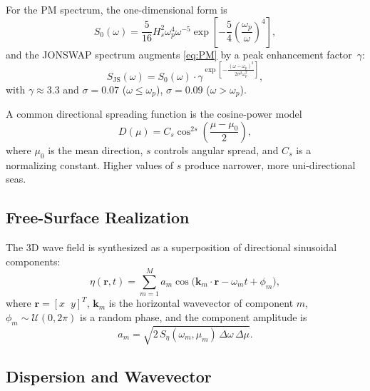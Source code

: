 \documentclass[journal,10pt,twocolumn]{IEEEtran}
\newcommand{\vect}[1]{\bm{#1}}
\begin{document}
    For the PM spectrum, the one-dimensional form is
    \begin{equation}
        S_0(\omega) = \frac{5}{16}H_s^2\omega_p^4\omega^{-5}
        \exp\!\left[-\frac{5}{4}\!\left(\frac{\omega_p}{\omega}\right)^{\!4}\right],
        \label{eq:PM}
    \end{equation}
    and the JONSWAP spectrum augments \eqref{eq:PM} by a peak enhancement factor~$\gamma$:
    \begin{equation}
        S_{\mathrm{JS}}(\omega) = S_0(\omega)\cdot
        \gamma^{\exp\!\left[-\frac{(\omega-\omega_p)^2}{2\sigma^2\omega_p^2}\right]},
        \label{eq:JONSWAP}
    \end{equation}
    with $\gamma\approx3.3$ and $\sigma=0.07$ ($\omega\le\omega_p$),
    $\sigma=0.09$ ($\omega>\omega_p$).

    A common directional spreading function is the cosine-power model
    \begin{equation}
        D(\mu) = C_s\cos^{2s}\!\left(\frac{\mu-\mu_0}{2}\right),
        \label{eq:spreading}
    \end{equation}
    where $\mu_0$ is the mean direction, $s$ controls angular spread, and $C_s$ is a
    normalizing constant.
    Higher values of $s$ produce narrower, more uni-directional seas.

    \subsection{Free-Surface Realization}
    \label{sec:realization}

    The 3D wave field is synthesized as a superposition of directional sinusoidal
    components:
    \begin{equation}
        \eta(\vect{r},t)
        = \sum_{m=1}^{M}
        a_m\cos\!\bigl(\vect{k}_m\!\cdot\!\vect{r} - \omega_m t + \phi_m\bigr),
        \label{eq:realization}
    \end{equation}
    where $\vect{r}=[x\;\;y]^T$, $\vect{k}_m$ is the horizontal wavevector of component
    $m$, $\phi_m\sim\mathcal{U}(0,2\pi)$ is a random phase, and the component amplitude is
    \begin{equation}
        a_m = \sqrt{2\,S_\eta(\omega_m,\mu_m)\,\Delta\omega\,\Delta\mu}.
        \label{eq:amplitude}
    \end{equation}

    \subsection{Dispersion and Wavevector}
    \label{sec:dispersion}
\end{document}
